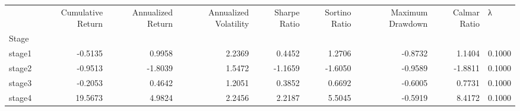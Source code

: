 \begin{tabular}{lrrrrrrr}
\toprule
 & Cumulative Return & Annualized Return & Annualized Volatility & Sharpe Ratio & Sortino Ratio & Maximum Drawdown & Calmar Ratio & λ \\
Stage &  &  &  &  &  &  &  &  \\
\midrule
stage1 & -0.5135 & 0.9958 & 2.2369 & 0.4452 & 1.2706 & -0.8732 & 1.1404 & 0.1000 \\
stage2 & -0.9513 & -1.8039 & 1.5472 & -1.1659 & -1.6050 & -0.9589 & -1.8811 & 0.1000 \\
stage3 & -0.2053 & 0.4642 & 1.2051 & 0.3852 & 0.6692 & -0.6005 & 0.7731 & 0.1000 \\
stage4 & 19.5673 & 4.9824 & 2.2456 & 2.2187 & 5.5045 & -0.5919 & 8.4172 & 0.1000 \\
\bottomrule
\end{tabular}
